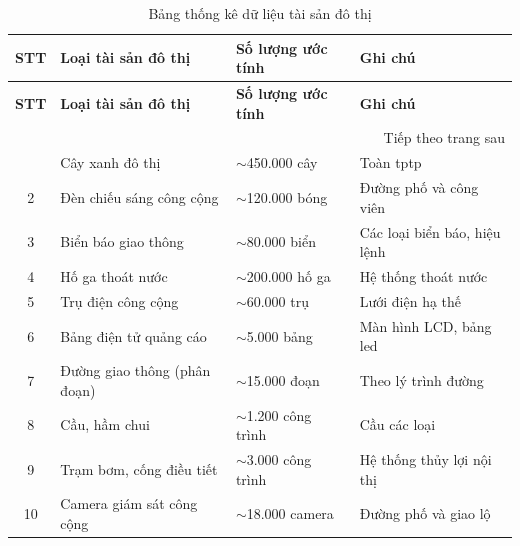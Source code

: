 \begin{longtable}{|c|p{4cm}|p{3.5cm}|p{5cm}|}
\caption{Bảng thống kê dữ liệu tài sản đô thị \label{tab:phu_luc_2}} \\
\hline
\textbf{STT} & \textbf{Loại tài sản đô thị} & \textbf{Số lượng ước tính} & \textbf{Ghi chú} \\ \hline
\endfirsthead
\hline
\textbf{STT} & \textbf{Loại tài sản đô thị} & \textbf{Số lượng ước tính} & \textbf{Ghi chú} \\ \hline
\endhead
\hline
\multicolumn{4}{r}{{Tiếp theo trang sau}} \\
\endfoot
\hline
\endlastfoot
1 & Cây xanh đô thị & $\sim$450.000 cây & Toàn \gls{tptp} \\ \hline
2 & Đèn chiếu sáng công cộng & $\sim$120.000 bóng & Đường phố và công viên \\ \hline
3 & Biển báo giao thông & $\sim$80.000 biển & Các loại biển báo, hiệu lệnh \\ \hline
4 & Hố ga thoát nước & $\sim$200.000 hố ga & Hệ thống thoát nước \\ \hline
5 & Trụ điện công cộng & $\sim$60.000 trụ & Lưới điện hạ thế \\ \hline
6 & Bảng điện tử quảng cáo & $\sim$5.000 bảng & Màn hình LCD, bảng led \\ \hline
7 & Đường giao thông (phân đoạn) & $\sim$15.000 đoạn & Theo lý trình đường \\ \hline
8 & Cầu, hầm chui & $\sim$1.200 công trình & Cầu các loại \\ \hline
9 & Trạm bơm, cống điều tiết & $\sim$3.000 công trình & Hệ thống thủy lợi nội thị \\ \hline
10 & Camera giám sát công cộng & $\sim$18.000 camera & Đường phố và giao lộ \\ \hline
\end{longtable}